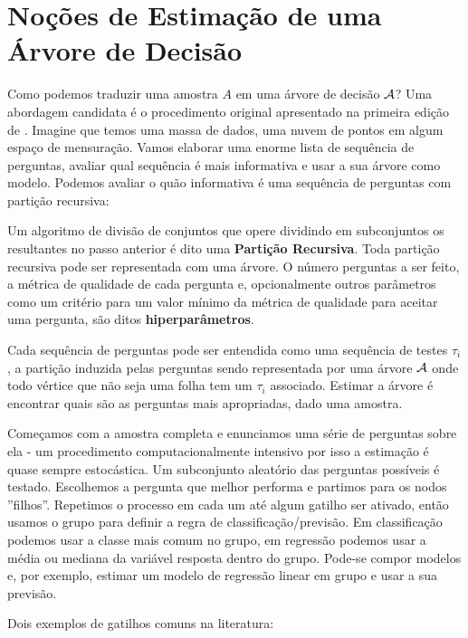 \section{Noções de Estimação de uma Árvore de Decisão}

Como podemos traduzir uma amostra $A$ em uma árvore de decisão $\mathcal{A}$? Uma abordagem candidata é o procedimento original apresentado na primeira edição de . Imagine que temos uma massa de dados, uma nuvem de pontos em algum espaço de mensuração. Vamos elaborar uma enorme lista de sequência de perguntas, avaliar qual sequência é mais informativa e usar a sua árvore como modelo. Podemos avaliar o quão informativa é uma sequência de perguntas com partição recursiva:

\begin{defi}
Um algoritmo de divisão de conjuntos que opere dividindo em subconjuntos os resultantes no passo anterior é dito uma \textbf{Partição Recursiva}. Toda partição recursiva pode ser representada com uma árvore. O número perguntas a ser feito, a métrica de qualidade de cada pergunta e, opcionalmente outros parâmetros como um critério para um valor mínimo da métrica de qualidade para aceitar uma pergunta, são ditos \textbf{hiperparâmetros}.
\end{defi}

Cada sequência de perguntas pode ser entendida como uma sequência de testes $\tau_i$, a partição induzida pelas perguntas sendo representada por uma árvore $\mathcal{A}$ onde todo vértice que não seja uma folha tem um $\tau_i$ associado. Estimar a árvore é encontrar quais são as perguntas mais apropriadas, dado uma amostra. 

Começamos com a amostra completa e enunciamos uma série de perguntas sobre ela - um procedimento computacionalmente intensivo por isso a estimação é quase sempre estocástica. Um subconjunto aleatório das perguntas possíveis é testado. Escolhemos a pergunta que melhor performa e partimos para os nodos ''filhos''. Repetimos o processo em cada um até algum gatilho ser ativado, então usamos o grupo para definir a regra de classificação/previsão. Em classificação podemos usar a classe mais comum no grupo, em regressão podemos usar a média ou mediana da variável resposta dentro do grupo. Pode-se compor modelos e, por exemplo, estimar um modelo de regressão linear em grupo e usar a sua previsão.  

Dois exemplos de gatilhos comuns na literatura:

